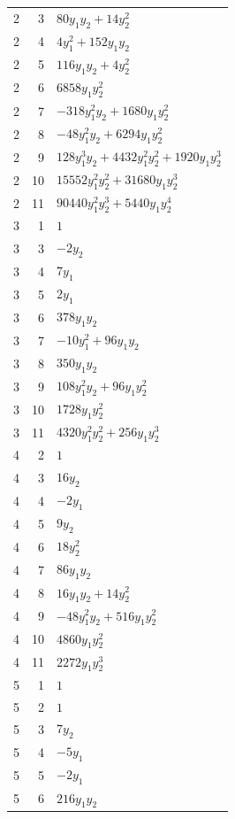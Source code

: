\documentclass[10pt,a4paper]{article}
\begin{document}
{\begin{longtable}{rrp{125mm}}
2 & 3 & $80 y_{1} y_{2} + 14 y_{2}^{2}$\\
2 & 4 & $4 y_{1}^{2} + 152 y_{1} y_{2}$\\
2 & 5 & $116 y_{1} y_{2} + 4 y_{2}^{2}$\\
2 & 6 & $6858 y_{1} y_{2}^{2}$\\
2 & 7 & $- 318 y_{1}^{2} y_{2} + 1680 y_{1} y_{2}^{2}$\\
2 & 8 & $- 48 y_{1}^{2} y_{2} + 6294 y_{1} y_{2}^{2}$\\
2 & 9 & $128 y_{1}^{3} y_{2} + 4432 y_{1}^{2} y_{2}^{2} + 1920 y_{1} y_{2}^{3}$\\
2 & 10 & $15552 y_{1}^{2} y_{2}^{2} + 31680 y_{1} y_{2}^{3}$\\
2 & 11 & $90440 y_{1}^{2} y_{2}^{3} + 5440 y_{1} y_{2}^{4}$\\
3 & 1 & $1$\\
3 & 3 & $- 2 y_{2}$\\
3 & 4 & $7 y_{1}$\\
3 & 5 & $2 y_{1}$\\
3 & 6 & $378 y_{1} y_{2}$\\
3 & 7 & $- 10 y_{1}^{2} + 96 y_{1} y_{2}$\\
3 & 8 & $350 y_{1} y_{2}$\\
3 & 9 & $108 y_{1}^{2} y_{2} + 96 y_{1} y_{2}^{2}$\\
3 & 10 & $1728 y_{1} y_{2}^{2}$\\
3 & 11 & $4320 y_{1}^{2} y_{2}^{2} + 256 y_{1} y_{2}^{3}$\\
4 & 2 & $1$\\
4 & 3 & $16 y_{2}$\\
4 & 4 & $- 2 y_{1}$\\
4 & 5 & $9 y_{2}$\\
4 & 6 & $18 y_{2}^{2}$\\
4 & 7 & $86 y_{1} y_{2}$\\
4 & 8 & $16 y_{1} y_{2} + 14 y_{2}^{2}$\\
4 & 9 & $- 48 y_{1}^{2} y_{2} + 516 y_{1} y_{2}^{2}$\\
4 & 10 & $4860 y_{1} y_{2}^{2}$\\
4 & 11 & $2272 y_{1} y_{2}^{3}$\\
5 & 1 & $1$\\
5 & 2 & $1$\\
5 & 3 & $7 y_{2}$\\
5 & 4 & $- 5 y_{1}$\\
5 & 5 & $- 2 y_{1}$\\
5 & 6 & $216 y_{1} y_{2}$\\

\end{longtable}}
\end{document}
